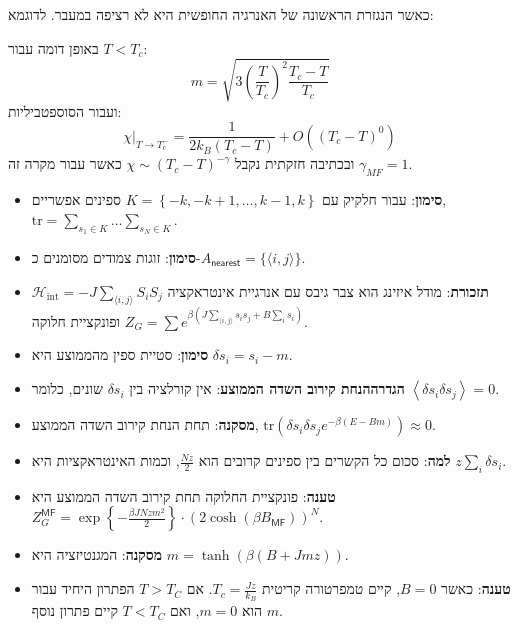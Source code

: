 \documentclass{tstextbook}
\begin{document}
\begin{definition}
כאשר הנגזרת הראשונה של האנרגיה החופשית היא לא רציפה במעבר. לדוגמא:

\end{definition}
\begin{proposition}
באופן דומה עבור \(T<T_{c}\):
$$m=\sqrt{3\left(\frac{T}{T_{c}}\right)^{2}\frac{T_{c}-T}{T_{c}}}$$
ועבור הסוספטביליות:
$$\chi\big|_{T\rightarrow T_{c}^{-}}=\frac{1}{2k_{B}\left(T_{c}-T\right)}+O\left((T_{c}-T)^{0}\right)$$
ובכתיבה חזקתית נקבל \(\chi \sim (T_{c}-T)^{-\gamma}\) כאשר עבור מקרה זה \(\gamma_{MF}=1\).

\end{proposition}
\begin{summary}
  \begin{itemize}
    \item \textbf{סימון}: עבור חלקיק עם \(K=\left\{ -k,-k+1,\dots,k-1,k \right\}\) ספינים אפשריים, \(\text{tr}=\sum_{s_{1} \in K}\dots \sum_{s_{N}\in K}\).
    \item \textbf{סימון}: זוגות צמודים מסומנים כ-\(A_{\mathsf{nearest}}=\{\langle i,j\rangle\}\).
    \item \textbf{תזכורת}: מודל איזינג הוא צבר גיבס עם אנרגיית אינטראקציה \(\mathcal{H}_{\mathrm{int}}=-J\sum_{\langle i,j\rangle}S_{i}S_{j}\) ופונקציית חלוקה \(Z_{G}=\sum e^{\beta\left(J\sum_{\langle i,j\rangle}s_{i}s_{j}+B\sum_{i}s_{i}\right)}\).
    \item \textbf{סימון}: סטיית ספין מהממוצע היא \(\delta s_{i}=s_{i}-m\).
    \item \textbf{הגדרה}\textbf{הנחת קירוב השדה הממוצע}: אין קורלציה בין \(\delta s_{i}\) שונים, כלומר \(\left\langle\delta{s_{i}}\delta{s_{j}}\right\rangle=0\).
    \item \textbf{מסקנה}: תחת הנחת קירוב השדה הממוצע, \(\mathrm{tr}\left(\delta s_{i}\delta s_{j}e^{-\beta(E-B m)}\right)\approx 0\).
    \item \textbf{למה}: סכום כל הקשרים בין ספינים קרובים הוא \(\frac{N z}{2}\), וכמות האינטראקציות היא \(z\sum_{i}\delta s_{i}\).
    \item \textbf{טענה}: פונקציית החלוקה תחת קירוב השדה הממוצע היא \(Z_{G}^{\mathsf{M F}}=\exp\left\{-{\frac{\beta J N z m^{2}}{2}}\right\}\cdot(2\cosh\left(\beta B_{\mathsf{M F}}\right))^{N}\).
    \item \textbf{מסקנה}: המגנטיזציה היא \(m=\operatorname{tanh}\left(\beta\left(B+J m z\right)\right)\).
    \item \textbf{טענה}: כאשר \(B=0\), קיים טמפרטורה קריטית \(T_{c}=\frac{Jz}{k_{B}}\). אם \(T>T_{C}\) הפתרון היחיד עבור \(m\) הוא \(m=0\), ואם \(T<T_{C}\) קיים פתרון נוסף.

\end{itemize}
\end{summary}
\end{document}
